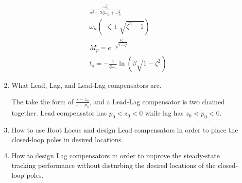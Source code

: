 \documentclass[10pt]{article}
\begin{document}
\begin{enumerate}
    \begin{gather*}
        \frac{\omega_n^2}{s^2 + 2\zeta\omega_n + \omega_n^2}\\
        \omega_n(-\zeta\pm\sqrt{\zeta^2-1})\\
        M_p=e^{-\frac{\pi\zeta}{\sqrt{1-\zeta^2}}}\\
        t_s=-\frac{1}{\zeta\omega_n}\ln(\beta\sqrt{1-\zeta^2})
    \end{gather*}

    \item What Lead, Lag, and Lead-Lag compensators are.

    The take the form of \(\frac{s-z_0}{s-p_0}\), and a Lead-Lag compensator is two chained together.
    Lead compensator has \(p_0<z_0<0\) while lag has \(z_0<p_0<0\).

    \item How to use Root Locus and design Lead compensators in order to place the closed-loop
    poles in desired locations.

    \item How to design Lag compensators in order to improve the steady-state tracking performance
    without disturbing the desired locations of the closed-loop poles.

\end{enumerate}
\end{document}
